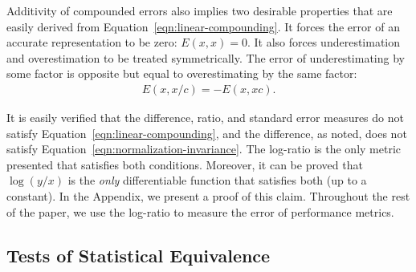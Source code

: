 \documentclass[conference]{IEEEtran}
\begin{document}
Additivity of compounded errors also implies two desirable properties that are easily derived from Equation~\ref{eqn:linear-compounding}. It forces the error of an accurate representation to be zero: $E(x,x) = 0$. It also forces underestimation and overestimation to be treated symmetrically. The error of underestimating by some factor is opposite but equal to overestimating by the same factor:
\begin{align}
E(x,x/c) = - E(x,xc).
\end{align}

It is easily verified that the difference, ratio, and standard error measures do not satisfy Equation~\ref{eqn:linear-compounding}, and the difference, as noted, does not satisfy Equation~\ref{eqn:normalization-invariance}. The log-ratio is the only metric presented that satisfies both conditions. Moreover, it can be proved that $\log(y/x)$ is the \textit{only} differentiable function that satisfies both (up to a constant). In the Appendix, we present a proof of this claim. Throughout the rest of the paper, we use the log-ratio to measure the error of performance metrics.

\subsection{Tests of Statistical Equivalence}\label{sec:statistical-equivalence}
\end{document}
